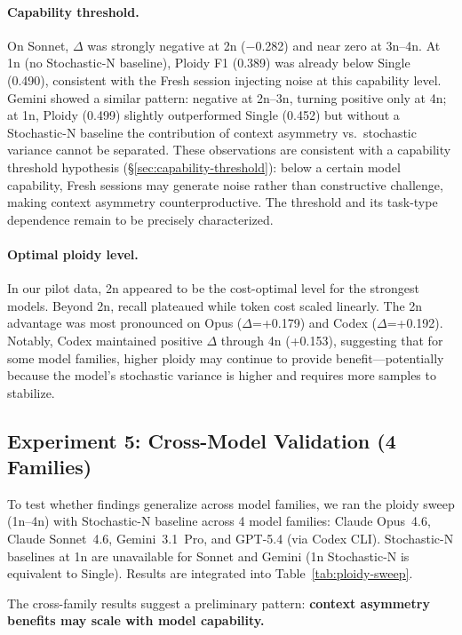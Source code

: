 \documentclass[11pt]{article}
\begin{document}
\paragraph{Capability threshold.} On Sonnet, $\Delta$ was strongly negative at 2n ($-$0.282) and near zero at 3n--4n. At 1n (no Stochastic-N baseline), Ploidy F1 (0.389) was already below Single (0.490), consistent with the Fresh session injecting noise at this capability level. Gemini showed a similar pattern: negative at 2n--3n, turning positive only at 4n; at 1n, Ploidy (0.499) slightly outperformed Single (0.452) but without a Stochastic-N baseline the contribution of context asymmetry vs.\ stochastic variance cannot be separated. These observations are consistent with a capability threshold hypothesis (\S\ref{sec:capability-threshold}): below a certain model capability, Fresh sessions may generate noise rather than constructive challenge, making context asymmetry counterproductive. The threshold and its task-type dependence remain to be precisely characterized.

\paragraph{Optimal ploidy level.} In our pilot data, 2n appeared to be the cost-optimal level for the strongest models. Beyond 2n, recall plateaued while token cost scaled linearly. The 2n advantage was most pronounced on Opus ($\Delta$=+0.179) and Codex ($\Delta$=+0.192). Notably, Codex maintained positive $\Delta$ through 4n (+0.153), suggesting that for some model families, higher ploidy may continue to provide benefit---potentially because the model's stochastic variance is higher and requires more samples to stabilize.

\subsection{Experiment 5: Cross-Model Validation (4 Families)}
\label{sec:cross-model}

To test whether findings generalize across model families, we ran the ploidy sweep (1n--4n) with Stochastic-N baseline across 4 model families: Claude Opus~4.6, Claude Sonnet~4.6, Gemini~3.1~Pro, and GPT-5.4 (via Codex CLI). Stochastic-N baselines at 1n are unavailable for Sonnet and Gemini (1n Stochastic-N is equivalent to Single). Results are integrated into Table~\ref{tab:ploidy-sweep}.

The cross-family results suggest a preliminary pattern: \textbf{context asymmetry benefits may scale with model capability.}
\end{document}
